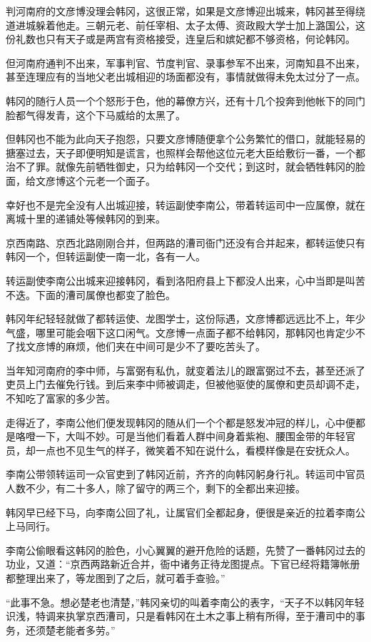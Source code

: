 判河南府的文彦博没理会韩冈，这很正常，如果是文彦博迎出城来，韩冈甚至得绕道进城躲着他走。三朝元老、前任宰相、太子太傅、资政殿大学士加上潞国公，这份礼数也只有天子或是两宫有资格接受，连皇后和嫔妃都不够资格，何论韩冈。

但河南府通判不出来，军事判官、节度判官、录事参军不出来，河南知县不出来，甚至连理应有的当地父老出城相迎的场面都没有，事情就做得未免太过分了一点。

韩冈的随行人员一个个怒形于色，他的幕僚方兴，还有十几个投奔到他帐下的同门脸都气得发青，这个下马威给的太黑了。

但韩冈也不能为此向天子抱怨，只要文彦博随便拿个公务繁忙的借口，就能轻易的搪塞过去，天子即便明知是谎言，也照样会帮他这位元老大臣给敷衍一番，一个都治不了罪。就像先前牺牲御史，只为给韩冈一个交代；到这时，就会牺牲韩冈的脸面，给文彦博这个元老一个面子。

幸好也不是完全没有人出城迎接，转运副使李南公，带着转运司中一应属僚，就在离城十里的递铺处等候韩冈的到来。

京西南路、京西北路刚刚合并，但两路的漕司衙门还没有合并起来，都转运使只有韩冈一个，但转运副使一南一北，各有一人。

转运副使李南公出城来迎接韩冈，看到洛阳府县上下都没人出来，心中当即是叫苦不迭。下面的漕司属僚也都变了脸色。

韩冈年纪轻轻就做了都转运使、龙图学士，这份际遇，文彦博都远远比不上，年少气盛，哪里可能会咽下这口闲气。文彦博一点面子都不给韩冈，那韩冈也肯定少不了找文彦博的麻烦，他们夹在中间可是少不了要吃苦头了。

当年知河南府的李中师，与富弼有私仇，就变着法儿的跟富弼过不去，甚至还派了吏员上门去催免行钱。到后来李中师被调走，但被他驱使的属僚和吏员却调不走，不知吃了富家的多少苦。

走得近了，李南公他们便发现韩冈的随从们一个个都是怒发冲冠的样儿，心中便都是咯噔一下，大叫不妙。可是当他们看着人群中间身着紫袍、腰围金带的年轻官员，却一点也不见生气的样子，微笑着不知在说什么，看模样像是在安抚众人。

李南公带领转运司一众官吏到了韩冈近前，齐齐的向韩冈躬身行礼。转运司中官员人数不少，有二十多人，除了留守的两三个，剩下的全都出来迎接。

韩冈早已经下马，向李南公回了礼，让属官们全都起身，便很是亲近的拉着李南公上马同行。

李南公偷眼看这韩冈的脸色，小心翼翼的避开危险的话题，先赞了一番韩冈过去的功业，又道：“京西两路新近合并，衙中诸务正待龙图提点。下官已经将籍簿帐册都整理出来了，等龙图到了之后，就可着手查验。”

“此事不急。想必楚老也清楚，”韩冈亲切的叫着李南公的表字，“天子不以韩冈年轻识浅，特调来执掌京西漕司，只是看韩冈在土木之事上稍有所得，至于漕司中的事务，还须楚老能者多劳。”

